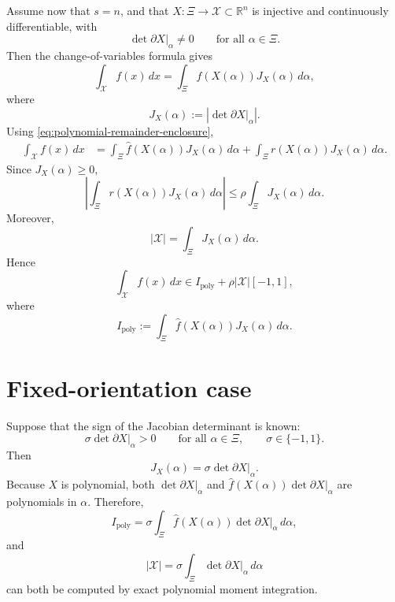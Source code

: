 \documentclass[11pt]{article}
\newcommand{\R}{\mathbb{R}}
\newcommand{\abs}[1]{\left\lvert #1\right\rvert}
\begin{document}
Assume now that \(s=n\), and that \(X:\Xi\to\mathcal{X}\subset\R^n\) is injective and continuously differentiable, with
\[
    \det\left.\partial X\right|_\alpha\neq 0
    \qquad
    \text{for all }\alpha\in\Xi.
\]
Then the change-of-variables formula gives
\begin{equation}
    \int_{\mathcal{X}} f(x)\,dx
    =
    \int_\Xi f(X(\alpha))J_X(\alpha)\,d\alpha,
    \label{eq:change-of-variables}
\end{equation}
where
\begin{equation}
    J_X(\alpha):=
    \abs{\det\left.\partial X\right|_\alpha}.
    \label{eq:jacobian-density}
\end{equation}
Using \eqref{eq:polynomial-remainder-enclosure},
\begin{align}
    \int_{\mathcal{X}} f(x)\,dx
    &=
    \int_\Xi \widehat f(X(\alpha))J_X(\alpha)\,d\alpha
    +
    \int_\Xi r(X(\alpha))J_X(\alpha)\,d\alpha.
\end{align}
Since \(J_X(\alpha)\geq 0\),
\[
    \abs{\int_\Xi r(X(\alpha))J_X(\alpha)\,d\alpha}
    \leq
    \rho\int_\Xi J_X(\alpha)\,d\alpha.
\]
Moreover,
\begin{equation}
    \abs{\mathcal{X}}=\int_\Xi J_X(\alpha)\,d\alpha.
    \label{eq:image-volume}
\end{equation}
Hence
\begin{equation}
    \boxed{
    \int_{\mathcal{X}} f(x)\,dx
    \in
    I_{\mathrm{poly}}+\rho\abs{\mathcal{X}}[-1,1],
    }
    \label{eq:geometric-integral-general}
\end{equation}
where
\begin{equation}
    I_{\mathrm{poly}}
    :=
    \int_\Xi \widehat f(X(\alpha))J_X(\alpha)\,d\alpha.
    \label{eq:geometric-polynomial-part}
\end{equation}

\section{Fixed-orientation case}

Suppose that the sign of the Jacobian determinant is known:
\begin{equation}
    \sigma\det\left.\partial X\right|_\alpha>0
    \qquad
    \text{for all }\alpha\in\Xi,
    \qquad
    \sigma\in\{-1,1\}.
    \label{eq:fixed-orientation}
\end{equation}
Then
\[
    J_X(\alpha)=\sigma\det\left.\partial X\right|_\alpha.
\]
Because \(X\) is polynomial, both \(\det\left.\partial X\right|_\alpha\) and \(\widehat f(X(\alpha))\det\left.\partial X\right|_\alpha\) are polynomials in \(\alpha\). Therefore,
\begin{equation}
    I_{\mathrm{poly}}
    =
    \sigma\int_\Xi \widehat f(X(\alpha))\det\left.\partial X\right|_\alpha\,d\alpha,
    \label{eq:fixed-orientation-poly-integral}
\end{equation}
and
\begin{equation}
    \abs{\mathcal{X}}
    =
    \sigma\int_\Xi \det\left.\partial X\right|_\alpha\,d\alpha
    \label{eq:fixed-orientation-volume}
\end{equation}
can both be computed by exact polynomial moment integration.
\end{document}
